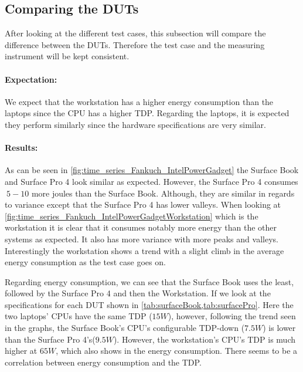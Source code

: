 


\subsection{Comparing the DUTs}
After looking at the different test cases, this subsection will compare the difference between the DUTs. Therefore the test case and the measuring instrument will be kept consistent. 

\paragraph{Expectation:}
We expect that the workstation has a higher energy consumption than the laptops since the CPU has a higher TDP. Regarding the laptops, it is expected they perform similarly since the hardware specifications are very similar.

\paragraph{Results:}
As can be seen in \cref{fig:time_series_Fankuch_IntelPowerGadget} the Surface Book and Surface Pro 4 look similar as expected. However, the Surface Pro 4 consumes $~5-10$ more joules than the Surface Book. Although, they are similar in regards to variance except that the Surface Pro 4 has lower valleys. When looking at \cref{fig:time_series_Fankuch_IntelPowerGadgetWorkstation} which is the workstation it is clear that it consumes notably more energy than the other systems as expected. It also has more variance with more peaks and valleys. Interestingly the workstation shows a trend with a slight climb in the average energy consumption as the test case goes on.



Regarding energy consumption, we can see that the Surface Book uses the least, followed by the Surface Pro 4 and then the Workstation. If we look at the specifications for each DUT shown in \cref{tab:surfaceBook,tab:surfacePro}. Here the two laptops' CPUs have the same TDP ($15W$), however, following the trend seen in the graphs, the Surface Book's CPU's configurable TDP-down ($7.5W$) is lower than the Surface Pro 4's($9.5W$). However, the workstation's CPU's TDP is much higher at $65W$, which also shows in the energy consumption. There seems to be a correlation between energy consumption and the TDP.

